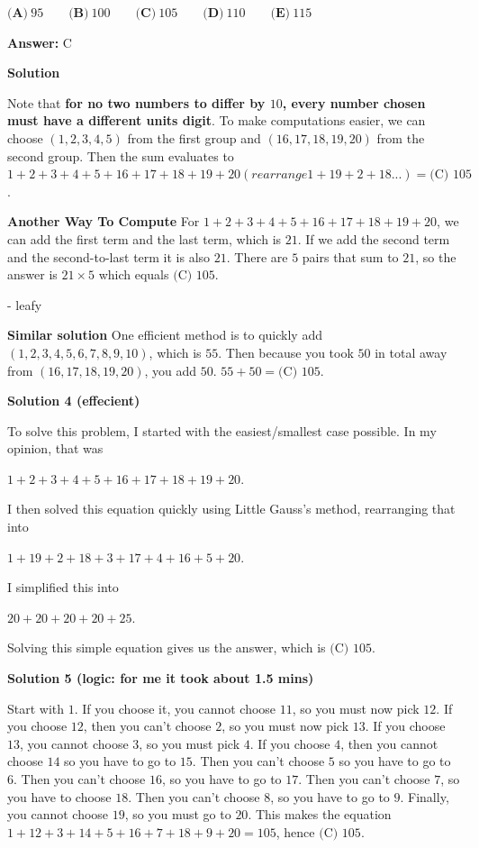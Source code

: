 \begin{enumerate}
 

$\textbf{(A)}\ 95\qquad \textbf{(B)}\ 100\qquad \textbf{(C)}\ 105\qquad \textbf{(D)}\ 110\qquad \textbf{(E)}\ 115$

 \textbf{Answer: }C



\textbf{Solution}

Note that \textbf{for no two numbers to differ by $10$, every number chosen must have a different units digit}. To make computations easier, we can choose $(1, 2, 3, 4, 5)$ from the first group and $(16, 17, 18, 19, 20)$ from the second group. Then the sum evaluates to $1+2+3+4+5+16+17+18+19+20  (rearrange    1+19+2+18...) = \boxed{\text{(C)\ 105}}$.

 \textbf{Another Way To Compute} For $1+2+3+4+5+16+17+18+19+20$, we can add the first term and the last term, which is $21$. If we add the second term and the second-to-last term it is also $21$. There are $5$ pairs that sum to $21$, so the answer is $21 \times 5$ which equals $\boxed{\text{(C)\ 105}}$. 

 - leafy

 \textbf{Similar solution} One efficient method is to quickly add $(1, 2, 3, 4, 5, 6, 7, 8, 9, 10)$, which is $55$. Then because you took $50$ in total away from $(16, 17, 18, 19, 20)$, you add $50$. $55+50= \boxed{\text{(C)\ 105}}$.

 


 



\textbf{Solution 4 (effecient)}

To solve this problem, I started with the easiest/smallest case possible. In my opinion, that was

 
$1+2+3+4+5+16+17+18+19+20$.

 
I then solved this equation quickly using Little Gauss's method, rearranging that into

 
$1+19+2+18+3+17+4+16+5+20$.

 
I simplified this into

 
$20+20+20+20+25$.

 
Solving this simple equation gives us the answer, which is $\boxed{\text{(C)\ 105}}$.

 



\textbf{Solution 5 (logic: for me it took about 1.5 mins)}

Start with $1$. If you choose it, you cannot choose $11$, so you must now pick $12$. If you choose $12$, then you can't choose $2$, so you must now pick $13$. If you choose $13$, you cannot choose $3$, so you must pick $4$. If you choose $4$, then you cannot choose $14$ so you have to go to $15$. Then you can't choose $5$ so you have to go to $6$. Then you can't choose $16$, so you have to go to $17$. Then you can't choose $7$, so you have to choose $18$. Then you can't choose $8$, so you have to go to $9$. Finally, you cannot choose $19$, so you must go to $20$. This makes the equation $1+12+3+14+5+16+7+18+9+20 = 105$, hence $\boxed{\text{(C)\ 105}}$.


\end{enumerate}
